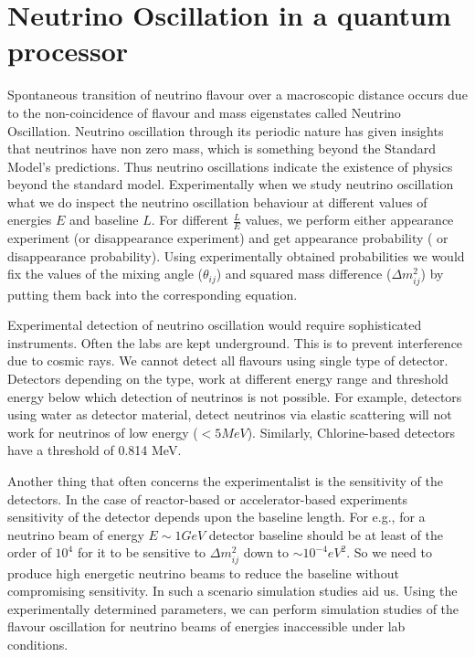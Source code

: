 \documentclass[12pt,a4paper]{report}
\begin{document}
\chapter{Neutrino Oscillation in a quantum processor}\label{sec4}
Spontaneous transition of neutrino flavour over a macroscopic distance occurs due to the non-coincidence of flavour and mass eigenstates called Neutrino Oscillation.  Neutrino oscillation through its periodic nature has given insights that neutrinos have non zero mass, which is something beyond the Standard Model’s predictions. Thus neutrino oscillations indicate the existence of physics beyond the standard model. Experimentally when we study neutrino oscillation what we do inspect the neutrino oscillation behaviour at different values of energies $E$ and baseline $L$. For different $\frac{L}{E}$ values, we perform either appearance experiment (or disappearance experiment) and get appearance probability ( or disappearance probability). Using experimentally obtained probabilities we would fix the values of the mixing angle ($\theta_{ij}$) and squared mass difference ($\Delta m_{ij}^{2}$) by putting them back into the corresponding equation. \par
Experimental detection of neutrino oscillation would require sophisticated instruments. Often the labs are kept underground. This is to prevent interference due to cosmic rays. We cannot detect all flavours using single type of detector.  Detectors depending on the type, work at different energy range and threshold energy below which detection of neutrinos is not possible. For example, detectors using water as detector material, detect neutrinos via elastic scattering will not work for neutrinos of low energy ($< 5 MeV$). Similarly, Chlorine-based detectors have a threshold of 0.814 MeV.\par
Another thing that often concerns the experimentalist is the sensitivity of the detectors. In the case of reactor-based or accelerator-based experiments sensitivity of the detector depends upon the baseline length. For e.g., for a neutrino beam of energy $E \sim 1 GeV$ detector baseline should be at least of the order of $10^{4}$  for it to be sensitive to $\Delta m_{ij}^{2}$ down to $\sim 10^{-4} eV^{2}$. So we need to produce high energetic neutrino beams to reduce the baseline without compromising sensitivity. In such a scenario simulation studies aid us. Using the experimentally determined parameters, we can perform simulation studies of the flavour oscillation for neutrino beams of energies inaccessible under lab conditions.\par
\end{document}
